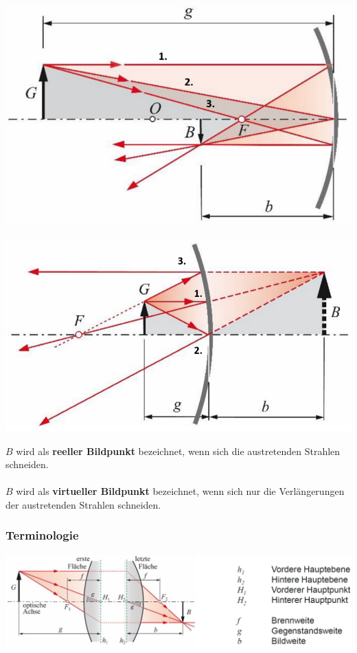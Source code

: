 \begin{minipage}{0.48\linewidth}
\includegraphics[width= 0.9\linewidth]{Bilder/Wellen-Optik/reelles_bild} \\
\end{minipage}
\hfill
\begin{minipage}{0.48\linewidth}
\includegraphics[width= 0.9\linewidth]{Bilder/Wellen-Optik/virtuelles_bild} \\
\end{minipage}


$B$ wird als \textbf{reeller Bildpunkt} bezeichnet, wenn sich die austretenden Strahlen schneiden. \\
\\
$B$ wird als \textbf{virtueller Bildpunkt} bezeichnet, wenn sich nur die Verlängerungen der austretenden Strahlen schneiden. 


\subsubsection{Terminologie}

\includegraphics[width=0.9\linewidth]{Bilder/Wellen-Optik/terminologie} \\

